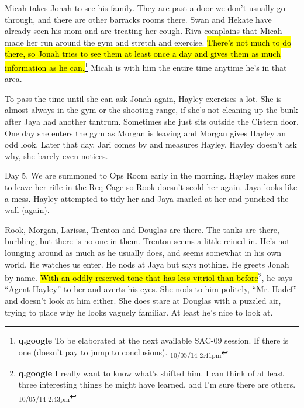 
Micah takes Jonah to see his family.  They are past a door we don't usually go through, and there are other barracks rooms there.  Swan and Hekate have already seen his mom and are treating her cough.  Riva complains that Micah made her run around the gym and stretch and exercise.  \hl{There's not much to do there, so Jonah tries to see them at least once a day and gives them as much information as he can.}\footnote{\textbf{q.google }To be elaborated at the next available SAC-09 session.  If there is one (doesn't pay to jump to conclusions). \textsubscript{10/05/14 2:41pm}}  Micah is with him the entire time anytime he's in that area.



To pass the time until she can ask Jonah again, Hayley exercises a lot.  She is almost always in the gym or the shooting range, if she's not cleaning up the bunk after Jaya had another tantrum.  Sometimes she just sits outside the Cistern door.  One day she enters the gym as Morgan is leaving and Morgan gives Hayley an odd look.  Later that day, Jari comes by and measures Hayley.  Hayley doesn't ask why, she barely even notices.





Day 5.  We are summoned to Ops Room early in the morning.  Hayley makes sure to leave her rifle in the Req Cage so Rook doesn't scold her again.  Jaya looks like a mess. Hayley attempted to tidy her and Jaya snarled at her and punched the wall (again). 



Rook, Morgan, Larissa, Trenton and Douglas are there.  The tanks are there, burbling, but there is no one in them.  Trenton seems a little reined in.  He's not lounging around as much as he usually does, and seems somewhat in his own world.  He watches us enter.  He nods at Jaya but says nothing.  He greets Jonah by name.   \hl{With an oddly reserved tone that has less vitriol than before}\footnote{\textbf{q.google }I really want to know what's shifted him.  I can think of at least three interesting things he might have learned, and I'm sure there are others. \textsubscript{10/05/14 2:43pm}}, he says ``Agent Hayley'' to her and averts his eyes.  She nods to him politely, ``Mr. Hadef'' and doesn't look at him either.  She does stare at Douglas with a puzzled air, trying to place why he looks vaguely familiar.  At least he's nice to look at.



